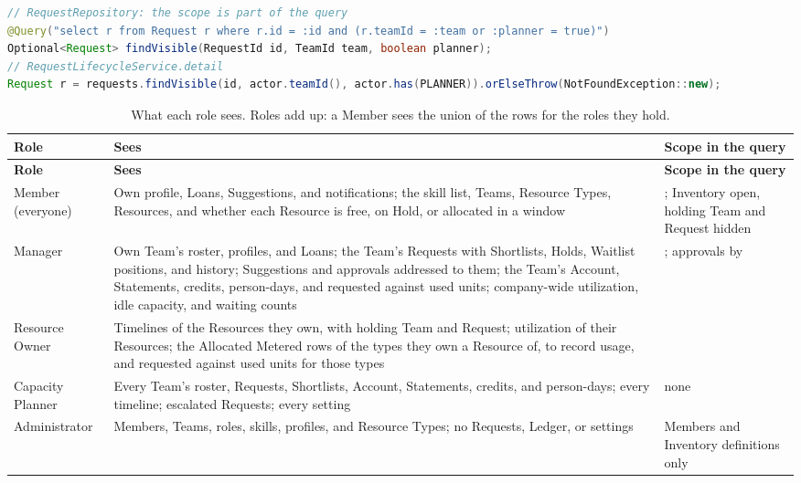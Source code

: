 \begin{lstlisting}[language=Java]
// RequestRepository: the scope is part of the query
@Query("select r from Request r where r.id = :id and (r.teamId = :team or :planner = true)")
Optional<Request> findVisible(RequestId id, TeamId team, boolean planner);
// RequestLifecycleService.detail
Request r = requests.findVisible(id, actor.teamId(), actor.has(PLANNER)).orElseThrow(NotFoundException::new);
\end{lstlisting}

{\footnotesize\renewcommand{\arraystretch}{1.08}
\begin{longtable}{@{}L{0.15\textwidth}L{0.55\textwidth}L{\tabcolsep\relax}@{}}
\caption{What each role sees. Roles add up: a Member sees the union of the rows for the roles they hold.}\label{tab:cross-visibility}\\
\toprule
\textbf{Role} & \textbf{Sees} & \textbf{Scope in the query} \\
\midrule
\endfirsthead
\toprule
\textbf{Role} & \textbf{Sees} & \textbf{Scope in the query} \\
\midrule
\endhead
\bottomrule
\endlastfoot
Member (everyone) & Own profile, Loans, Suggestions, and notifications; the skill list, Teams, Resource Types, Resources, and whether each Resource is free, on Hold, or allocated in a window & ; Inventory open, holding Team and Request hidden \\
Manager & Own Team's roster, profiles, and Loans; the Team's Requests with Shortlists, Holds, Waitlist positions, and history; Suggestions and approvals addressed to them; the Team's Account, Statements, credits, person-days, and requested against used units; company-wide utilization, idle capacity, and waiting counts & ; approvals by  \\
Resource Owner & Timelines of the Resources they own, with holding Team and Request; utilization of their Resources; the Allocated Metered rows of the types they own a Resource of, to record usage, and requested against used units for those types &  \\
Capacity Planner & Every Team's roster, Requests, Shortlists, Account, Statements, credits, and person-days; every timeline; escalated Requests; every setting & none \\
Administrator & Members, Teams, roles, skills, profiles, and Resource Types; no Requests, Ledger, or settings & Members and Inventory definitions only \\
\end{longtable}
}

